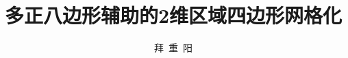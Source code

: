 \documentclass[bachelor,twoside,openright]{ustcthesis}
\title{多正八边形辅助的2维区域四边形网格化}%
\author{拜\ 重\ 阳}
\begin{document}
  \maketitle

\frontmatter
\makeatletter
\ifustc@bachelor
	
	
	\tableofcontents

	\ustclot
	\ustclof
	\ustcloa
	
\else
	\tableofcontents

	
\fi
\makeatother

\mainmatter
  
  
  
  

\backmatter


  


  \makeatletter
  \ifustc@bachelor\relax\else
    
  \fi
  \makeatother
\end{document}
